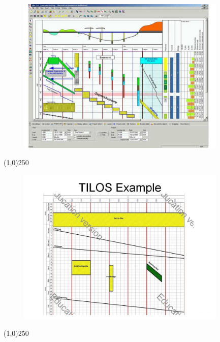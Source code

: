 \begin{frame}
\begin{figure}
	\centering
		\includegraphics[width = 10.0cm]{oldnotes/Slide315.jpg}
\end{figure}
\end{frame}
\begin{center}\line(1,0){250}\end{center}




\begin{frame}
\begin{figure}
	\centering
		\includegraphics[width = 10.0cm]{oldnotes/Slide316.jpg}
\end{figure}
\end{frame}
\begin{center}\line(1,0){250}\end{center}




